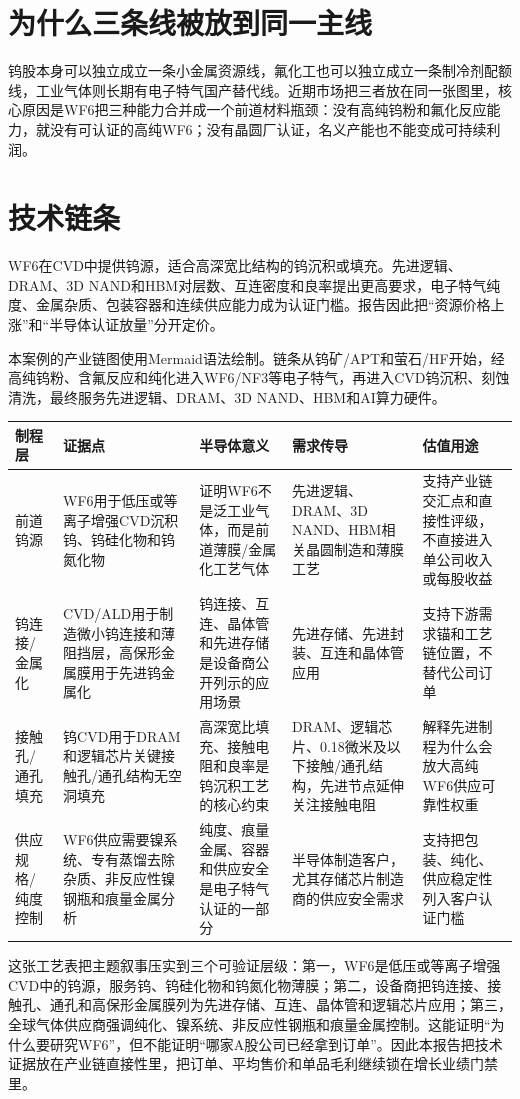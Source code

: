         \section{为什么三条线被放到同一主线}
        钨股本身可以独立成立一条小金属资源线，氟化工也可以独立成立一条制冷剂配额线，工业气体则长期有电子特气国产替代线。近期市场把三者放在同一张图里，核心原因是WF6把三种能力合并成一个前道材料瓶颈：没有高纯钨粉和氟化反应能力，就没有可认证的高纯WF6；没有晶圆厂认证，名义产能也不能变成可持续利润。

        \section{技术链条}
        WF6在CVD中提供钨源，适合高深宽比结构的钨沉积或填充。先进逻辑、DRAM、3D NAND和HBM对层数、互连密度和良率提出更高要求，电子特气纯度、金属杂质、包装容器和连续供应能力成为认证门槛。报告因此把“资源价格上涨”和“半导体认证放量”分开定价。

        \begin{exhibitbox}[Mermaid产业链图的语义摘要]
        本案例的产业链图使用Mermaid语法绘制。链条从钨矿/APT和萤石/HF开始，经高纯钨粉、含氟反应和纯化进入WF6/NF3等电子特气，再进入CVD钨沉积、刻蚀清洗，最终服务先进逻辑、DRAM、3D NAND、HBM和AI算力硬件。
        \end{exhibitbox}


\begin{exhibitbox}[制程/材料功能证据]
\scriptsize
\begin{tabularx}{\exhibitboxwidth}{L{1.2cm} X X X X}
\toprule
\textbf{制程层} & \textbf{证据点} & \textbf{半导体意义} & \textbf{需求传导} & \textbf{估值用途} \\
\midrule
前道钨源 & WF6用于低压或等离子增强CVD沉积钨、钨硅化物和钨氮化物 & 证明WF6不是泛工业气体，而是前道薄膜/金属化工艺气体 & 先进逻辑、DRAM、3D NAND、HBM相关晶圆制造和薄膜工艺 & 支持产业链交汇点和直接性评级，不直接进入单公司收入或每股收益 \\
钨连接/金属化 & CVD/ALD用于制造微小钨连接和薄阻挡层，高保形金属膜用于先进钨金属化 & 钨连接、互连、晶体管和先进存储是设备商公开列示的应用场景 & 先进存储、先进封装、互连和晶体管应用 & 支持下游需求锚和工艺链位置，不替代公司订单 \\
接触孔/通孔填充 & 钨CVD用于DRAM和逻辑芯片关键接触孔/通孔结构无空洞填充 & 高深宽比填充、接触电阻和良率是钨沉积工艺的核心约束 & DRAM、逻辑芯片、0.18微米及以下接触/通孔结构，先进节点延伸关注接触电阻 & 解释先进制程为什么会放大高纯WF6供应可靠性权重 \\
供应规格/纯度控制 & WF6供应需要镍系统、专有蒸馏去除杂质、非反应性镍钢瓶和痕量金属分析 & 纯度、痕量金属、容器和供应安全是电子特气认证的一部分 & 半导体制造客户，尤其存储芯片制造商的供应安全需求 & 支持把包装、纯化、供应稳定性列入客户认证门槛 \\
\bottomrule
\end{tabularx}
\end{exhibitbox}

这张工艺表把主题叙事压实到三个可验证层级：第一，WF6是低压或等离子增强CVD中的钨源，服务钨、钨硅化物和钨氮化物薄膜；第二，设备商把钨连接、接触孔、通孔和高保形金属膜列为先进存储、互连、晶体管和逻辑芯片应用；第三，全球气体供应商强调纯化、镍系统、非反应性钢瓶和痕量金属控制。这能证明“为什么要研究WF6”，但不能证明“哪家A股公司已经拿到订单”。因此本报告把技术证据放在产业链直接性里，把订单、平均售价和单品毛利继续锁在增长业绩门禁里。

